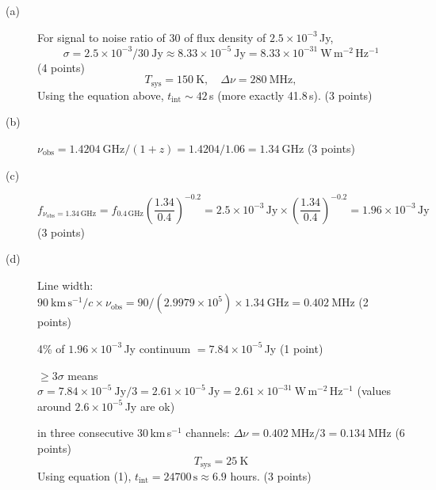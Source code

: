 \begin{description}
\item[(a)] For signal to noise ratio of 30 of flux density of
$2.5 \times 10^{-3}$\,Jy,
\[ \sigma = 2.5 \times 10^{-3}/30~\mathrm{Jy}
   \approx 8.33 \times 10^{-5}~\mathrm{Jy}
   = 8.33 \times 10^{-31}~\mathrm{W\,m^{-2}\,Hz^{-1}} \]
\hfill(4 points)
\[ T_{\mathrm{sys}} = 150~\mathrm{K}, \quad
   \Delta\nu = 280~\mathrm{MHz}, \]
Using the equation above, $t_{\mathrm{int}} \sim 42$\,s (more exactly
41.8\,s). \hfill(3 points)

\item[(b)] $\nu_{\mathrm{obs}} = 1.4204~\mathrm{GHz}/(1+z)
= 1.4204/1.06 = 1.34~\mathrm{GHz}$ \hfill(3 points)

\item[(c)]
\[ f_{\nu_{\mathrm{obs}}=1.34\,\mathrm{GHz}}
   = f_{0.4\,\mathrm{GHz}}\left(\frac{1.34}{0.4}\right)^{-0.2}
   = 2.5 \times 10^{-3}\,\mathrm{Jy}
     \times \left(\frac{1.34}{0.4}\right)^{-0.2}
   = 1.96 \times 10^{-3}\,\mathrm{Jy} \]
\hfill(3 points)

\item[(d)] Line width:
$90~\mathrm{km\,s^{-1}}/c \times \nu_{\mathrm{obs}}
 = 90/(2.9979 \times 10^{5}) \times 1.34~\mathrm{GHz}
 = 0.402~\mathrm{MHz}$ \hfill(2 points)

4\% of $1.96 \times 10^{-3}$\,Jy continuum
$= 7.84 \times 10^{-5}$\,Jy \hfill(1 point)

$\geq 3\sigma$ means
$\sigma = 7.84 \times 10^{-5}~\mathrm{Jy}/3
 = 2.61 \times 10^{-5}~\mathrm{Jy}
 = 2.61 \times 10^{-31}~\mathrm{W\,m^{-2}\,Hz^{-1}}$
(values around $2.6 \times 10^{-5}$\,Jy are ok)

in three consecutive 30\,km\,s$^{-1}$ channels:
$\Delta\nu = 0.402~\mathrm{MHz}/3 = 0.134~\mathrm{MHz}$ \hfill(6 points)
\[ T_{\mathrm{sys}} = 25~\mathrm{K} \]
Using equation (1), $t_{\mathrm{int}} = 24700\,\mathrm{s} \approx 6.9$ hours.
\hfill(3 points)
\end{description}

